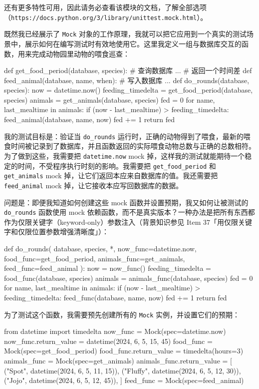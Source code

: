 还有更多特性可用，因此请务必查看该模块的文档，了解全部选项（\texttt{https://docs.python.org/3/library/unittest.mock.html}）。

既然我已经展示了 \texttt{Mock} 对象的工作原理，我就可以把它应用到一个真实的测试场景中，展示如何在编写测试时有效地使用它。这里我定义一组与数据库交互的函数，用来完成动物园里动物的喂食巡查：

\begin{codebox}[python]
def get_food_period(database, species):
    # 查询数据库
    ...
    # 返回一个时间差
def feed_animal(database, name, when):
    # 写入数据库
    ...
def do_rounds(database, species):
    now = datetime.now()
    feeding_timedelta = get_food_period(database, species)
    animals = get_animals(database, species)
    fed = 0
    for name, last_mealtime in animals:
        if (now - last_mealtime) > feeding_timedelta:
            feed_animal(database, name, now)
            fed += 1
    return fed
\end{codebox}

我的测试目标是：验证当 \texttt{do\_rounds} 运行时，正确的动物得到了喂食，最新的喂食时间被记录到了数据库，并且函数返回的实际喂食动物总数与正确的总数相符。为了做到这些，我需要把 \texttt{datetime.now} mock 掉，这样我的测试就能期待一个稳定的时间，不受程序执行时刻的影响。我需要把 \texttt{get\_food\_period} 和 \texttt{get\_animals} mock 掉，让它们返回本应来自数据库的值。我还需要把 \texttt{feed\_animal} mock 掉，让它接收本应写回数据库的数据。

问题是：即便我知道如何创建这些 mock 函数并设置预期，我又如何让被测试的 \texttt{do\_rounds} 函数使用 mock 依赖函数，而不是真实版本？一种办法是把所有东西都作为仅限关键字（keyword-only）参数注入（背景知识参见 Item 37「用仅限关键字和仅限位置参数增强清晰度」）：

\begin{codebox}[python]
def do_rounds(
    database,
    species,
    *,
    now_func=datetime.now,
    food_func=get_food_period,
    animals_func=get_animals,
    feed_func=feed_animal
):
    now = now_func()
    feeding_timedelta = food_func(database, species)
    animals = animals_func(database, species)
    fed = 0
    for name, last_mealtime in animals:
        if (now - last_mealtime) > feeding_timedelta:
            feed_func(database, name, now)
            fed += 1
    return fed
\end{codebox}

为了测试这个函数，我需要预先创建所有的 \texttt{Mock} 实例，并设置它们的预期：

\begin{codebox}[python]
from datetime import timedelta
now_func = Mock(spec=datetime.now)
now_func.return_value = datetime(2024, 6, 5, 15, 45)
food_func = Mock(spec=get_food_period)
food_func.return_value = timedelta(hours=3)
animals_func = Mock(spec=get_animals)
animals_func.return_value = [
    ("Spot", datetime(2024, 6, 5, 11, 15)),
    ("Fluffy", datetime(2024, 6, 5, 12, 30)),
    ("Jojo", datetime(2024, 6, 5, 12, 45)),
]
feed_func = Mock(spec=feed_animal)
\end{codebox}

